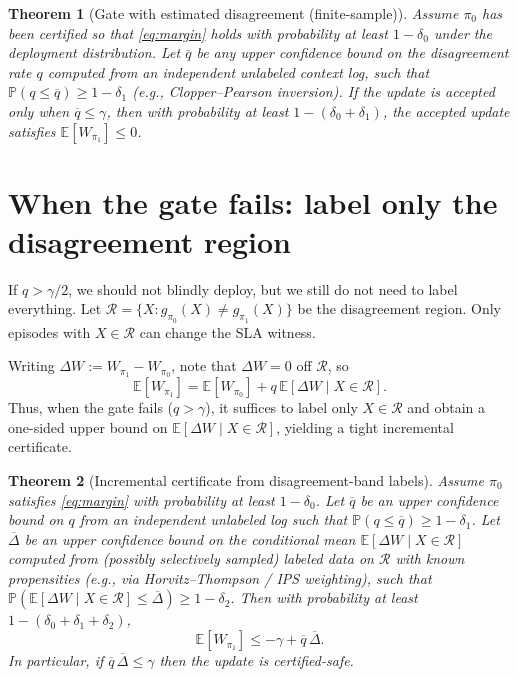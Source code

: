 \documentclass[11pt]{article}
\newtheorem{theorem}{Theorem}
\begin{document}
\begin{theorem}[Gate with estimated disagreement (finite-sample)]
\label{thm:gate-est}
Assume $\pi_0$ has been certified so that \eqref{eq:margin} holds with probability at least $1-\delta_0$ under the deployment distribution.
Let $\overline q$ be any upper confidence bound on the disagreement rate $q$ computed from an \emph{independent} unlabeled context log, such that $\mathbb{P}(q\le \overline q)\ge 1-\delta_1$ (e.g., Clopper--Pearson inversion).
If the update is accepted only when $\overline q\le \gamma$, then with probability at least $1-(\delta_0+\delta_1)$, the accepted update satisfies $\mathbb{E}[W_{\pi_1}]\le 0$.
\end{theorem}

\section{When the gate fails: label only the disagreement region}
If $q>\gamma/2$, we should not blindly deploy, but we still do not need to label everything.
Let $\mathcal{R}=\{X: g_{\pi_0}(X)\neq g_{\pi_1}(X)\}$ be the disagreement region.
Only episodes with $X\in\mathcal{R}$ can change the SLA witness.

Writing $\Delta W := W_{\pi_1}-W_{\pi_0}$, note that $\Delta W=0$ off $\mathcal{R}$, so
\[
  \mathbb{E}[W_{\pi_1}] = \mathbb{E}[W_{\pi_0}] + q\,\mathbb{E}[\Delta W \mid X\in\mathcal{R}].
\]
Thus, when the gate fails ($q>\gamma$), it suffices to label only $X\in\mathcal{R}$ and obtain a one-sided upper bound on $\mathbb{E}[\Delta W \mid X\in\mathcal{R}]$, yielding a tight incremental certificate.

\begin{theorem}[Incremental certificate from disagreement-band labels]
\label{thm:incremental}
Assume $\pi_0$ satisfies \eqref{eq:margin} with probability at least $1-\delta_0$.
Let $\overline q$ be an upper confidence bound on $q$ from an independent unlabeled log such that $\mathbb{P}(q\le \overline q)\ge 1-\delta_1$.
Let $\overline{\Delta}$ be an upper confidence bound on the conditional mean $\mathbb{E}[\Delta W\mid X\in\mathcal{R}]$ computed from (possibly selectively sampled) labeled data on $\mathcal{R}$ with known propensities (e.g., via Horvitz--Thompson / IPS weighting), such that $\mathbb{P}(\mathbb{E}[\Delta W\mid X\in\mathcal{R}]\le \overline{\Delta})\ge 1-\delta_2$.
Then with probability at least $1-(\delta_0+\delta_1+\delta_2)$,
\[
\mathbb{E}[W_{\pi_1}] \le -\gamma + \overline q\,\overline{\Delta}.
\]
In particular, if $\overline q\,\overline{\Delta}\le \gamma$ then the update is certified-safe.
\end{theorem}
\end{document}

